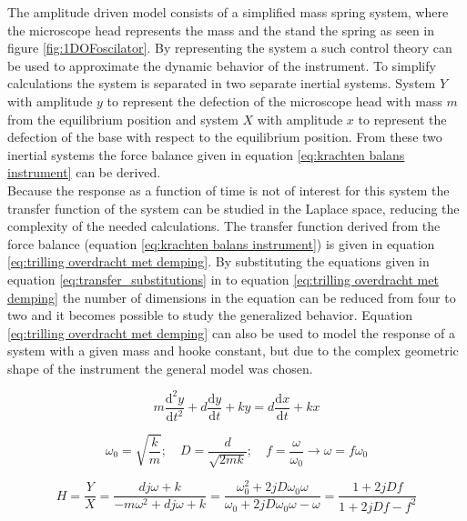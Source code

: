 \documentclass[10pt]{article}
\begin{document}
The amplitude driven model consists of a simplified mass spring system, where the microscope head represents the mass and the stand the spring as seen in figure \ref{fig:1DOFoscilator}.
By representing the system a such control theory can be used to approximate the dynamic behavior of the instrument. 
To simplify calculations the system is separated in two separate inertial systems.
System $Y$ with amplitude $y$ to represent the defection of the microscope head with mass $m$ from the equilibrium position and system $X$ with amplitude $x$ to represent the defection of the base with respect to the equilibrium position.
From these two inertial systems the force balance given in equation \ref{eq:krachten balans instrument} can be derived.\\
 
Because the response as a function of time is not of interest for this system the transfer function of the system can be studied in the Laplace space, reducing the complexity of the needed calculations.
The transfer function derived from the force balance (equation \ref{eq:krachten balans instrument}) is given in equation \ref{eq:trilling overdracht met demping}.
By substituting the equations given in equation \ref{eq:transfer_substitutions} in to equation \ref{eq:trilling overdracht met demping} the number of dimensions in the equation can be reduced from four to two and it becomes possible to study the generalized behavior.
Equation \ref{eq:trilling overdracht met demping} can also be used to model the response of a system with a given mass and hooke constant, but due to the complex geometric shape of the instrument the general model was chosen.

\begin{equation}
    m \frac{\mathrm{d}^2 y}{\mathrm{d} t^2} + d \frac{\mathrm{d}y}{\mathrm{d}t} +ky = d\frac{\mathrm{d}x}{\mathrm{d}t} + kx
    \label{eq:krachten balans instrument}
\end{equation}

\begin{equation}
    \omega_0 = \sqrt{\frac{k}{m}}; \quad D = \frac{d}{\sqrt{2mk}}; \quad f = \frac{\omega}{\omega_0}\rightarrow \omega = f\omega_0
    \label{eq:transfer_substitutions}
\end{equation}

\begin{equation*}
    H = \frac{Y}{X} = \frac{dj\omega + k}{-m\omega^2 +dj\omega + k} = \frac{\omega_0^2 +2jD \omega_0 \omega}{\omega_0 + 2jD\omega_0 \omega - \omega} = \frac{1 + 2jDf}{1+ 2jDf - f^2}
    \label{eq:trilling overdracht met demping}
\end{equation*}
\end{document}
